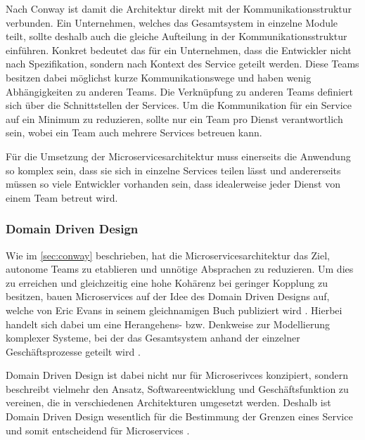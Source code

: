 Nach Conway ist damit die Architektur direkt mit der Kommunikationsstruktur verbunden. Ein Unternehmen, welches das Gesamtsystem in einzelne Module teilt, sollte deshalb auch die gleiche Aufteilung in der Kommunikationsstruktur einführen. Konkret bedeutet das für ein Unternehmen, dass die Entwickler nicht nach Spezifikation, sondern nach Kontext des Service geteilt werden. Diese Teams besitzen dabei möglichst kurze Kommunikationswege und haben wenig Abhängigkeiten zu anderen Teams. Die Verknüpfung zu anderen Teams definiert sich über die Schnittstellen der Services.
Um die Kommunikation für ein Service auf ein Minimum zu reduzieren, sollte nur ein Team pro Dienst verantwortlich sein, wobei ein Team auch mehrere Services betreuen kann. 

Für die Umsetzung der Microservicesarchitektur muss einerseits die Anwendung so komplex sein, dass sie sich in einzelne Services teilen lässt und andererseits müssen so viele Entwickler vorhanden sein, dass idealerweise jeder Dienst von einem Team betreut wird.

\subsubsection{Domain Driven Design}
\label{sec:ddd}

Wie im \cref{sec:conway} beschrieben, hat die Microservicesarchitektur das Ziel, autonome Teams zu etablieren und unnötige Absprachen zu reduzieren. Um dies zu erreichen und gleichzeitig eine hohe Kohärenz bei geringer Kopplung zu besitzen, bauen Microservices auf der Idee des Domain Driven Designs auf, welche von Eric Evans in seinem gleichnamigen Buch publiziert wird \parencite[vgl.][Kap. 2.4]{newman_monolith_2019}. Hierbei handelt sich dabei um eine Herangehens- bzw. Denkweise zur Modellierung komplexer Systeme, bei der das Gesamtsystem anhand der einzelner Geschäftsprozesse geteilt wird \parencite[vgl.][S. xix ff.]{evans_domain-driven_2003}.

Domain Driven Design ist dabei nicht nur für Microserivces konzipiert, sondern beschreibt vielmehr den Ansatz, Softwareentwicklung und Geschäftsfunktion zu vereinen, die in verschiedenen Architekturen umgesetzt werden. Deshalb ist Domain Driven Design wesentlich für die Bestimmung der Grenzen eines Service und somit entscheidend für Microservices \parencite[vgl.][Kap. 4.3]{wolff_microservices_2018}.

